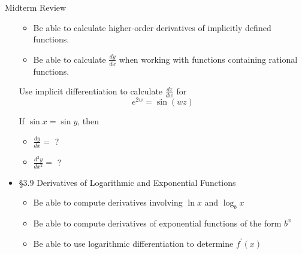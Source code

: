 \documentclass[cal1spr16Lectures.tex]{subfiles}
\begin{document}
\begin{frame}[allowframebreaks]{Midterm Review}
\begin{itemize}
\begin{itemize}
	\item Be able to calculate higher-order derivatives of implicitly defined functions.
	\item Be able to calculate $\textstyle\frac{dy}{dx}$ when working with functions containing rational functions.
	\end{itemize}
%
\begin{exe} Use implicit differentiation to calculate $\textstyle\frac{dz}{dw}$ for
\[e^{2w}=\sin(wz)\]
\end{exe}
\begin{exe} If $\sin x=\sin y$, then 
\begin{itemize}\footnotesize
\item $\textstyle\frac{dy}{dx}=$ ? 
\item $\textstyle\frac{d^2y}{dx^2}=$ ? 
\end{itemize}
\end{exe}
\framebreak
\item \S 3.9 Derivatives of Logarithmic and Exponential Functions
	\vspace{-0.5pc}
	\begin{itemize}\footnotesize
	\item Be able to compute derivatives involving $\ln x$ and $\log_b x$
	\item Be able to compute derivatives of exponential functions of the form $b^x$
	\item Be able to use logarithmic differentiation to determine $f^{\prime}(x)$
	\end{itemize}

\end{itemize}
\end{frame}

\end{document}
